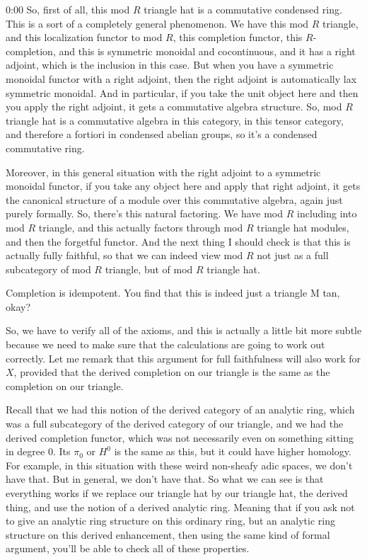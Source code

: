 \begin{unfinished}{0:00}
So, first of all, this mod $R$ triangle hat is a commutative condensed ring. This is a sort of a completely general phenomenon. We have this mod $R$ triangle, and this localization functor to mod $R$, this completion functor, this $R$-completion, and this is symmetric monoidal and cocontinuous, and it has a right adjoint, which is the inclusion in this case. But when you have a symmetric monoidal functor with a right adjoint, then the right adjoint is automatically lax symmetric monoidal. And in particular, if you take the unit object here and then you apply the right adjoint, it gets a commutative algebra structure. So, mod $R$ triangle hat is a commutative algebra in this category, in this tensor category, and therefore a fortiori in condensed abelian groups, so it's a condensed commutative ring.

Moreover, in this general situation with the right adjoint to a symmetric monoidal functor, if you take any object here and apply that right adjoint, it gets the canonical structure of a module over this commutative algebra, again just purely formally. So, there's this natural factoring. We have mod $R$ including into mod $R$ triangle, and this actually factors through mod $R$ triangle hat modules, and then the forgetful functor. And the next thing I should check is that this is actually fully faithful, so that we can indeed view mod $R$ not just as a full subcategory of mod $R$ triangle, but of mod $R$ triangle hat.

Completion is idempotent. You find that this is indeed just a triangle M tan, okay?

So, we have to verify all of the axioms, and this is actually a little bit more subtle because we need to make sure that the calculations are going to work out correctly. Let me remark that this argument for full faithfulness will also work for $X$, provided that the derived completion on our triangle is the same as the completion on our triangle.

Recall that we had this notion of the derived category of an analytic ring, which was a full subcategory of the derived category of our triangle, and we had the derived completion functor, which was not necessarily even on something sitting in degree $0$. Its $\pi_0$ or $H^0$ is the same as this, but it could have higher homology. For example, in this situation with these weird non-sheafy adic spaces, we don't have that. But in general, we don't have that. So what we can see is that everything works if we replace our triangle hat by our triangle hat, the derived thing, and use the notion of a derived analytic ring. Meaning that if you ask not to give an analytic ring structure on this ordinary ring, but an analytic ring structure on this derived enhancement, then using the same kind of formal argument, you'll be able to check all of these properties.


\end{unfinished}
